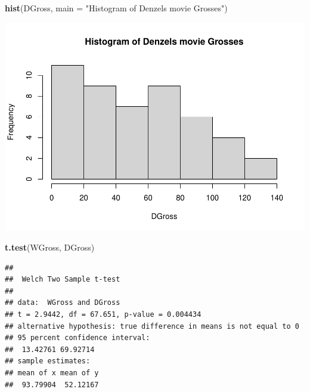 \documentclass[]{article}
\newenvironment{Shaded}{\begin{snugshade}}{\end{snugshade}}
\newcommand{\DataTypeTok}[1]{\textcolor[rgb]{0.13,0.29,0.53}{#1}}
\newcommand{\KeywordTok}[1]{\textcolor[rgb]{0.13,0.29,0.53}{\textbf{#1}}}
\newcommand{\NormalTok}[1]{#1}
\newcommand{\OperatorTok}[1]{\textcolor[rgb]{0.81,0.36,0.00}{\textbf{#1}}}
\newcommand{\StringTok}[1]{\textcolor[rgb]{0.31,0.60,0.02}{#1}}
\begin{document}
\begin{Shaded}
\begin{Highlighting}[]
\KeywordTok{hist}\NormalTok{(DGross, }\DataTypeTok{main =} \StringTok{"Histogram of Denzels movie Grosses"}\NormalTok{)}
\end{Highlighting}
\end{Shaded}

\includegraphics{Denzel-v-Will-data_files/figure-latex/unnamed-chunk-5-4.pdf}

\begin{Shaded}
\begin{Highlighting}[]
\KeywordTok{t.test}\NormalTok{(WGross, DGross)}
\end{Highlighting}
\end{Shaded}

\begin{verbatim}
## 
##  Welch Two Sample t-test
## 
## data:  WGross and DGross
## t = 2.9442, df = 67.651, p-value = 0.004434
## alternative hypothesis: true difference in means is not equal to 0
## 95 percent confidence interval:
##  13.42761 69.92714
## sample estimates:
## mean of x mean of y 
##  93.79904  52.12167
\end{verbatim}

\begin{Shaded}
\end{Shaded}
\end{document}
